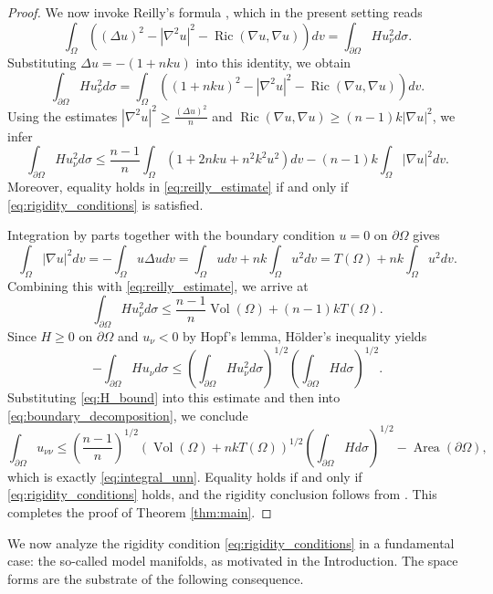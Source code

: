 \documentclass[reqno,11pt]{amsart}
\numberwithin{equation}{section}  %
\begin{document}
\begin{proof}
We now invoke Reilly's formula \cite{reilly}, which in the present setting reads
\[\int_{\Omega}\left((\Delta u)^2 - |\nabla^2 u|^2 - \operatorname{Ric}(\nabla u,\nabla u)\right) dv= \int_{\partial\Omega}H u_{\nu}^2d\sigma.\]
Substituting $\Delta u = -(1 + nku)$ into this identity, we obtain
\[\int_{\partial\Omega}H u_{\nu}^2d\sigma = \int_{\Omega}\left((1 + nku)^2 - |\nabla^2 u|^2 - \operatorname{Ric}(\nabla u,\nabla u)\right)dv.\]
Using the estimates $|\nabla^2 u|^2\geq \frac{(\Delta u)^2}{n}$ and $\operatorname{Ric}(\nabla u,\nabla u)\geq (n-1)k|\nabla u|^2$, we infer
\begin{equation}\label{eq:reilly_estimate}
\int_{\partial\Omega}H u_{\nu}^2d\sigma\leq \frac{n-1}{n}\int_{\Omega}\left(1 + 2nku + n^2k^2u^2\right)dv - (n-1)k\int_{\Omega}|\nabla u|^2dv.
\end{equation}
Moreover, equality holds in \eqref{eq:reilly_estimate} if and only if \eqref{eq:rigidity_conditions} is satisfied.

Integration by parts together with the boundary condition $u = 0$ on $\partial\Omega$ gives
\[\int_{\Omega}|\nabla u|^2dv = -\int_{\Omega}u\Delta udv = \int_{\Omega}udv + nk\int_{\Omega}u^2dv = T(\Omega) + nk\int_{\Omega}u^2dv.\]
Combining this with \eqref{eq:reilly_estimate}, we arrive at
\begin{equation}\label{eq:H_bound}
\int_{\partial\Omega}H u_{\nu}^2d\sigma\leq \frac{n-1}{n}\operatorname{Vol}(\Omega) + (n-1)kT(\Omega).
\end{equation}
Since $H\geq 0$ on $\partial\Omega$ and $u_{\nu}<0$ by Hopf's lemma, H\"older's inequality yields
\[-\int_{\partial\Omega}Hu_{\nu}d\sigma\leq \left(\int_{\partial\Omega}H u_{\nu}^2d\sigma\right)^{1/2}\left(\int_{\partial\Omega}Hd\sigma\right)^{1/2}.\]
Substituting \eqref{eq:H_bound} into this estimate and then into \eqref{eq:boundary_decomposition}, we conclude
\[\int_{\partial\Omega}u_{\nu\nu}\leq \left(\frac{n-1}{n}\right)^{1/2}\left(\operatorname{Vol}(\Omega) + nkT(\Omega)\right)^{1/2}\left(\int_{\partial\Omega}Hd\sigma\right)^{1/2} - \operatorname{Area}(\partial\Omega),\]
which is exactly \eqref{eq:integral_unn}. Equality holds if and only if \eqref{eq:rigidity_conditions} holds, and the rigidity conclusion follows from \cite[Lemma 6]{farina2022}. This completes the proof of Theorem \ref{thm:main}.
\end{proof}

We now analyze the rigidity condition \eqref{eq:rigidity_conditions} in a fundamental case: the so-called model manifolds, as motivated in the Introduction. The space forms are the substrate of the following consequence.
\end{document}
